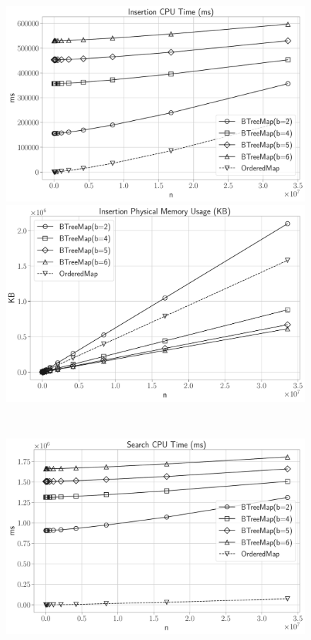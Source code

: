 \documentclass[12pt]{article}
\begin{document}
\begin{figure}[H]
	\centering
	\begin{minipage}{0.5\textwidth}
		\centering
		\includegraphics[width=1\linewidth]{../notebook/plot/insertion_cpu_time_(ms)}
	\end{minipage}\hfill
	\begin{minipage}{0.5\textwidth}
		\centering
		\includegraphics[width=1\linewidth]{../notebook/plot/insertion_physical_memory_usage_(kb)}
	\end{minipage}\hfill 
	\\
	\begin{minipage}{0.5\textwidth}
		\centering
		\includegraphics[width=1\linewidth]{../notebook/plot/search_cpu_time_(ms)}

\end{minipage}
\end{figure}
\end{document}
